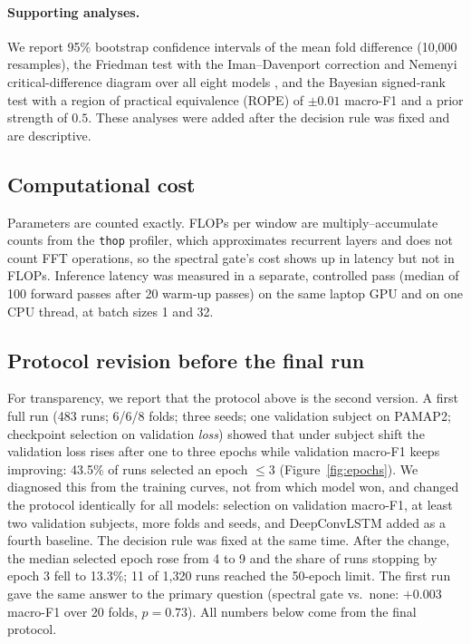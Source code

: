 \documentclass[11pt,a4paper]{article}
\begin{document}
\paragraph{Supporting analyses.}
We report 95\% bootstrap confidence intervals of the mean fold difference (10{,}000 resamples), the Friedman test \cite{friedman1937use} with the Iman--Davenport correction and Nemenyi critical-difference diagram over all eight models \cite{demsar2006statistical}, and the Bayesian signed-rank test \cite{benavoli2017time} with a region of practical equivalence (ROPE) of $\pm0.01$ macro-F1 and a prior strength of $0.5$. These analyses were added after the decision rule was fixed and are descriptive.

\subsection{Computational cost}
Parameters are counted exactly. FLOPs per window are multiply--accumulate counts from the \texttt{thop} profiler, which approximates recurrent layers and does not count FFT operations, so the spectral gate's cost shows up in latency but not in FLOPs. Inference latency was measured in a separate, controlled pass (median of 100 forward passes after 20 warm-up passes) on the same laptop GPU and on one CPU thread, at batch sizes 1 and 32.

\subsection{Protocol revision before the final run}
\label{sec:protocolfix}
For transparency, we report that the protocol above is the second version. A first full run (483 runs; 6/6/8 folds; three seeds; one validation subject on PAMAP2; checkpoint selection on validation \emph{loss}) showed that under subject shift the validation loss rises after one to three epochs while validation macro-F1 keeps improving: 43.5\% of runs selected an epoch $\le3$ (Figure~\ref{fig:epochs}). We diagnosed this from the training curves, not from which model won, and changed the protocol identically for all models: selection on validation macro-F1, at least two validation subjects, more folds and seeds, and DeepConvLSTM added as a fourth baseline. The decision rule was fixed at the same time. After the change, the median selected epoch rose from 4 to 9 and the share of runs stopping by epoch 3 fell to 13.3\%; 11 of 1{,}320 runs reached the 50-epoch limit. The first run gave the same answer to the primary question (spectral gate vs.\ none: $+0.003$ macro-F1 over 20 folds, $p=0.73$). All numbers below come from the final protocol.
\end{document}

